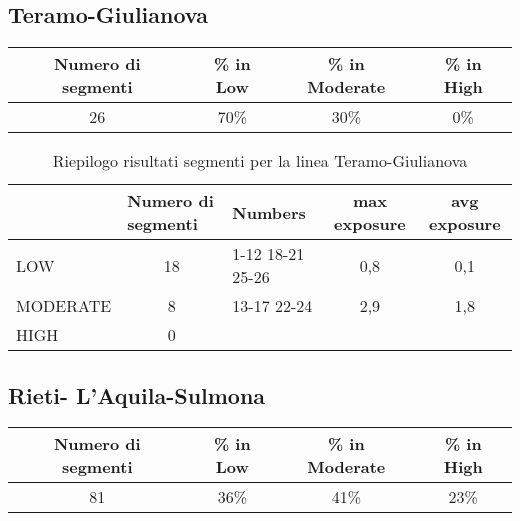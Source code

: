 \subsection{Teramo-Giulianova}
\label{app:giulianovateramo}
\centering
\begin{tabular}  {|c|c|c|c|} 
	
	\hline 
	Numero di segmenti  & \% in Low & \% in Moderate & \% in High \\ 
	\hline 
	26  & 70\% & 30\% & 0\% \\ 
	\hline 
\end{tabular} 
\begin{table}[bh]
	\centering
	\caption{Riepilogo risultati segmenti per la linea Teramo-Giulianova}
	\label{my-label}
	\begin{tabular}{|l|c|l|c|c|}
		\hline
		& \multicolumn{1}{l|}{Numero di segmenti} & Numbers          & max exposure & avg exposure \\ \hline
		LOW      & 18                                      & 1-12 18-21 25-26 & 0,8 & 0,1 \\ \hline
		MODERATE & 8                                       & 13-17 22-24      & 2,9 & 1,8  \\ \hline
		HIGH     & 0                                       &                  &              &              \\ \hline
	\end{tabular}
\end{table}
\newpage





\subsection{Rieti- L'Aquila-Sulmona}
\label{app:sulmonarieti}
\centering
\begin{tabular}  {|c|c|c|c|} 
	
	\hline 
	Numero di segmenti  & \% in Low & \% in Moderate & \% in High \\ 
	\hline 
	81  & 36\% & 41\% & 23\% \\ 
	\hline 
\end{tabular} 

